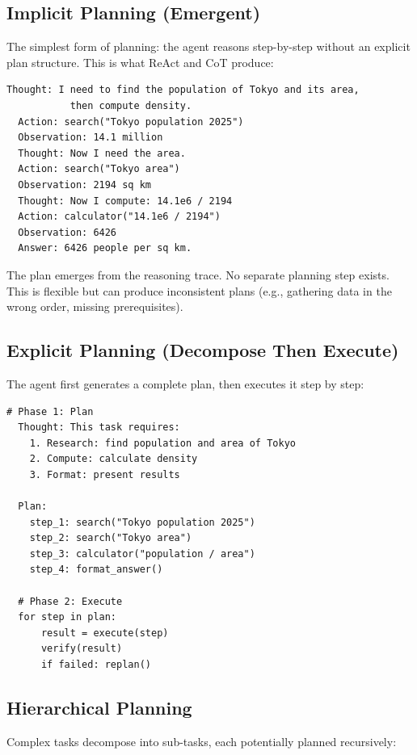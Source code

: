 \subsection{Implicit Planning (Emergent)}

The simplest form of planning: the agent reasons step-by-step without an explicit plan structure. This is what ReAct and CoT produce:

\begin{lstlisting}[caption=Implicit planning in ReAct]
  Thought: I need to find the population of Tokyo and its area,
           then compute density.
  Action: search("Tokyo population 2025")
  Observation: 14.1 million
  Thought: Now I need the area.
  Action: search("Tokyo area")
  Observation: 2194 sq km
  Thought: Now I compute: 14.1e6 / 2194
  Action: calculator("14.1e6 / 2194")
  Observation: 6426
  Answer: 6426 people per sq km.
\end{lstlisting}

The plan emerges from the reasoning trace. No separate planning step exists. This is flexible but can produce inconsistent plans (e.g., gathering data in the wrong order, missing prerequisites).

\subsection{Explicit Planning (Decompose Then Execute)}

The agent first generates a complete plan, then executes it step by step:

\begin{lstlisting}[caption=Explicit plan-and-execute]
  # Phase 1: Plan
  Thought: This task requires:
    1. Research: find population and area of Tokyo
    2. Compute: calculate density
    3. Format: present results

  Plan:
    step_1: search("Tokyo population 2025")
    step_2: search("Tokyo area")
    step_3: calculator("population / area")
    step_4: format_answer()

  # Phase 2: Execute
  for step in plan:
      result = execute(step)
      verify(result)
      if failed: replan()
\end{lstlisting}

\subsection{Hierarchical Planning}

Complex tasks decompose into sub-tasks, each potentially planned recursively:

